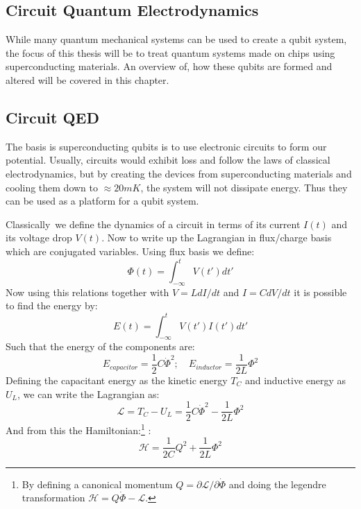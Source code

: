 \begin{fullwidth}
\chapter{Circuit Quantum Electrodynamics}\label{chap:cQED}
\end{fullwidth}
While many quantum mechanical systems can be used to create a qubit system, the focus of this thesis will be to treat quantum systems made on chips using superconducting materials. An overview of, how these qubits are formed and altered will be covered in this chapter.\\

\section{Circuit QED}
The basis is superconducting qubits is to use electronic circuits to form our potential. Usually, circuits would exhibit loss and follow the laws of classical electrodynamics, but by creating the devices from superconducting materials and cooling them down to $\approx 20 \unit{mK}$, the system will not dissipate energy. Thus they can be used as a platform for a qubit system.

Classically\, we define the dynamics of a circuit in terms of its current $I(t)$ and its voltage drop $V(t)$. Now to write up the Lagrangian in flux/charge basis which are conjugated variables. Using flux basis we define:
\begin{equation}
    \Phi (t) = \int_{-\infty}^t V(t')dt'
\end{equation}
Now using this relations together with $V = L dI/dt$ and $I = C dV/dt$ it is possible to find the energy by:
\begin{equation}\label{eq: Energy from current and voltage}
    E(t) = \int_{-\infty}^t V(t')I(t')dt'
\end{equation}
Such that the energy of the components are:
\begin{equation}
    E_{capacitor} = \frac12 C \dot{\Phi}^2; \quad E_{inductor} = \frac{1}{2L} \Phi^2
\end{equation}
Defining the capacitant energy as the kinetic energy $T_C$ and inductive energy as $U_L$, we can write the Lagrangian as:
\begin{equation}
    \mathcal{L} = T_C - U_L = \frac12 C \dot{\Phi}^2 - \frac{1}{2L} \Phi^2
\end{equation}
And from this the Hamiltonian:\footnote{By defining a canonical momentum $Q = \partial \mathcal{L} / \partial \dot{\Phi}$ and doing the legendre transformation $\mathcal{H} = Q\dot{\Phi} - \mathcal{L}$.} \cite{krantz_quantum_2019}:
\begin{equation}
    \mathcal{H} = \frac{1}{2C} Q^2 + \frac{1}{2L} \Phi^2
\end{equation}

